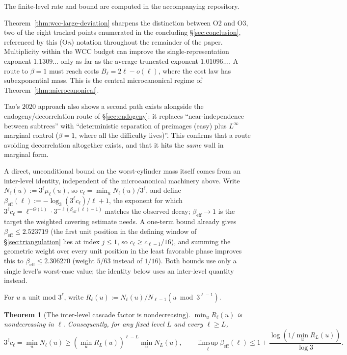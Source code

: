 \documentclass[11pt]{article}
\newtheorem{theorem}{Theorem}[section]
\theoremstyle{definition}
\theoremstyle{remark}
\begin{document}
The finite-level rate and bound are computed in the accompanying
repository.

Theorem~\ref{thm:wcc-large-deviation} sharpens the distinction between
O2 and O3, two of the eight tracked points enumerated in the
concluding \S\ref{sec:conclusion}, referenced by this (O\emph{n})
notation throughout the remainder of the paper. Multiplicity within
the WCC budget can improve the
single-representation exponent $1.1309\ldots$ only as far as the
average truncated exponent $1.01096\ldots$. A route to $\beta=1$ must
reach costs $B_\ell=2\ell-o(\ell)$, where the cost law has
subexponential mass. This is the central microcanonical regime of
Theorem~\ref{thm:microcanonical}.

Tao's $2020$ approach also shows a second path exists alongside the
endogeny/decorrelation route of \S\ref{sec:endogeny}: it replaces
``near-independence between subtrees'' with ``deterministic separation
of preimages (easy) plus $L^\infty$ marginal control ($\beta=1$, where
all the difficulty lives)''. This confirms that a route avoiding
decorrelation altogether exists, and that it hits the \emph{same} wall
in marginal form.

A direct, unconditional bound on the worst-cylinder mass itself comes
from an inter-level identity, independent of the microcanonical
machinery above. Write $N_\ell(u):=3^\ell\mu_\ell(u)$, so
$c_\ell=\min_uN_\ell(u)/3^\ell$, and define
$\beta_{\mathrm{eff}}(\ell):=-\log_3(3^\ell c_\ell)/\ell+1$, the
exponent for which $3^\ell c_\ell=\ell^{-\Theta(1)}\cdot
3^{-\ell(\beta_{\mathrm{eff}}(\ell)-1)}$ matches the observed decay;
$\beta_{\mathrm{eff}}\to1$ is the target the weighted covering
estimate needs. A one-term bound already gives
$\beta_{\mathrm{eff}}\le2.523719$ (the first unit position in the
defining window of \S\ref{sec:triangulation} lies at index $j\le1$, so
$c_\ell\ge c_{\ell-1}/16$), and summing the geometric weight over every
unit position in the least favorable phase improves this to
$\beta_{\mathrm{eff}}\le2.306270$ (weight $5/63$ instead of $1/16$).
Both bounds use only a single level's worst-case value; the identity
below uses an inter-level quantity instead.

For $u$ a unit mod $3^\ell$, write
$R_\ell(u):=N_\ell(u)/N_{\ell-1}(u\bmod3^{\ell-1})$.

\begin{theorem}[The inter-level cascade factor is nondecreasing]
\label{thm:cascade-factor}
$\min_uR_\ell(u)$ is nondecreasing in $\ell$. Consequently, for any
fixed level $L$ and every $\ell\ge L$,
\[
 3^\ell c_\ell=\min_uN_\ell(u)\ge(\min_uR_L(u))^{\ell-L}\min_uN_L(u),
 \qquad
 \limsup_\ell\beta_{\mathrm{eff}}(\ell)\le
 1+\frac{\log(1/\min_uR_L(u))}{\log3}.
\]
\end{theorem}
\end{document}
